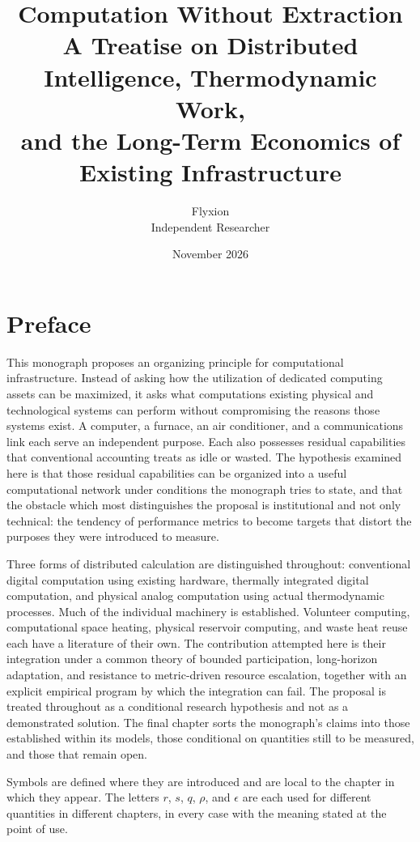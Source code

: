 \documentclass[11pt,openany]{book}
\title{Computation Without Extraction\\[0.6em]
\large A Treatise on Distributed Intelligence, Thermodynamic Work,\\
and the Long-Term Economics of Existing Infrastructure}
\author{Flyxion\\Independent Researcher}
\date{November 2026}
\theoremstyle{plain}
\theoremstyle{definition}
\theoremstyle{remark}
\begin{document}
\frontmatter
\maketitle

\chapter*{Preface}

This monograph proposes an organizing principle for computational infrastructure. Instead of asking how the utilization of dedicated computing assets can be maximized, it asks what computations existing physical and technological systems can perform without compromising the reasons those systems exist. A computer, a furnace, an air conditioner, and a communications link each serve an independent purpose. Each also possesses residual capabilities that conventional accounting treats as idle or wasted. The hypothesis examined here is that those residual capabilities can be organized into a useful computational network under conditions the monograph tries to state, and that the obstacle which most distinguishes the proposal is institutional and not only technical: the tendency of performance metrics to become targets that distort the purposes they were introduced to measure.

Three forms of distributed calculation are distinguished throughout: conventional digital computation using existing hardware, thermally integrated digital computation, and physical analog computation using actual thermodynamic processes. Much of the individual machinery is established. Volunteer computing, computational space heating, physical reservoir computing, and waste heat reuse each have a literature of their own. The contribution attempted here is their integration under a common theory of bounded participation, long-horizon adaptation, and resistance to metric-driven resource escalation, together with an explicit empirical program by which the integration can fail. The proposal is treated throughout as a conditional research hypothesis and not as a demonstrated solution. The final chapter sorts the monograph's claims into those established within its models, those conditional on quantities still to be measured, and those that remain open.

Symbols are defined where they are introduced and are local to the chapter in which they appear. The letters $r$, $s$, $q$, $\rho$, and $\epsilon$ are each used for different quantities in different chapters, in every case with the meaning stated at the point of use.
\end{document}
